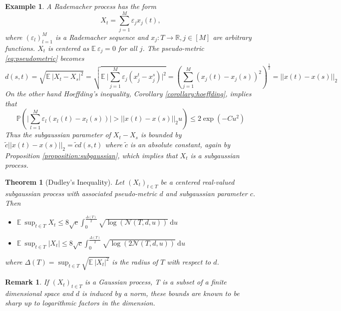 \documentclass[10pt,a4paper]{article}
\theoremstyle{thmstyle}
\newtheorem{theorem}{Theorem}
\newtheorem{example}{Example}
\newtheorem{remark}{Remark}
\newcommand{\diff}{~\mathrm{d}}
\newcommand{\E}{\mathbb{E}~}
\renewcommand{\Pr}[1]{\mathbb{P}\left( #1 \right)}
\begin{document}
\begin{example}
  A \emph{Rademacher process} has the form
  \begin{equation*}
    X_{t} = \sum_{j = 1}^{M} \varepsilon_{j} x_{j}(t),
  \end{equation*}
  where $(\varepsilon_{l})_{l = 1}^{M}$ is a Rademacher sequence and $x_{j} : T \rightarrow \mathbb{R}, j \in [M]$ are arbitrary functions.
  $X_t$ is centered as $\E \varepsilon_{j} = 0$ for all $j$.
  The pseudo-metric \eqref{eq:pseudometric} becomes
  \begin{equation*}
    d(s, t) = \sqrt{\E |X_{t} - X_{s}|^{2}} = \sqrt{\E \Big| \sum_{j = 1}^{M} \varepsilon_{j} (x_{j}^{t} - x_{j}^{s}) \Big|^{2}} = \left( \sum_{j = 1}^{M} \left( x_{j}(t) - x_{j}(s) \right)^{2} \right)^{\frac{1}{2}} = ||x(t) - x(s)||_{2}
  \end{equation*}
  On the other hand Hoeffding's inequality, Corollary \ref{corollary:hoeffding}, implies that
  \begin{equation*}
    \Pr{\Big| \sum_{l = 1}^{M} \varepsilon_{l} (x_{l}(t) - x_{l}(s)) \Big| > ||x(t) - x(s)||_{2} u} \le 2\exp(-Cu^{2})
  \end{equation*}
  Thus the subgaussian parameter of $X_{t} - X_{s}$ is bounded by $\tilde{c}||x(t) - x(s)||_{2} = \tilde{c}d(s, t)$ where $\tilde{c}$ is an absolute constant, again by Proposition \ref{proposition:subgaussian}, which implies that $X_{t}$ is a subgaussian process.
\end{example}

\begin{theorem}[Dudley's Inequality]
  Let $(X_{t})_{t \in T}$ be a centered real-valued subgaussian process with associated pseudo-metric $d$ and subgaussian parameter $c$.
  Then
  \begin{itemize}
  \item $\E \sup_{t \in T} X_{t} \le 8\sqrt{c} \int_{0}^{\frac{\Delta(T)}{2}} \sqrt{\log(\mathcal{N}(T, d, u))} \diff u$
  \item $\E \sup_{t \in T} |X_{t}| \le 8\sqrt{c} \int_{0}^{\frac{\Delta(T)}{2}} \sqrt{\log(2\mathcal{N}(T, d, u))} \diff u$
  \end{itemize}
  where $\Delta(T) = \sup_{t \in T} \sqrt{\E |X_{t}|^{2}}$ is the radius of $T$ with respect to $d$.
\end{theorem}

\begin{remark}
  If $(X_{t})_{t \in T}$ is a Gaussian process, T is a subset of a finite dimensional space and $d$ is induced by a norm, these bounds are known to be sharp up to logarithmic factors in the dimension.
\end{remark}
\end{document}
